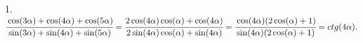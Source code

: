 1. $\cfrac{\cos(3\alpha)+\cos(4\alpha)+\cos(5\alpha)}{\sin(3\alpha)+\sin(4\alpha)+\sin(5\alpha)}=\cfrac{2\cos(4\alpha)\cos(\alpha)+\cos(4\alpha)}{2\sin(4\alpha)\cos(\alpha)+
\sin(4\alpha)}=\cfrac{\cos(4\alpha)(2\cos(\alpha)+1)}{\sin(4\alpha)(2\cos(\alpha)+1)}=ctg(4\alpha).$\\
